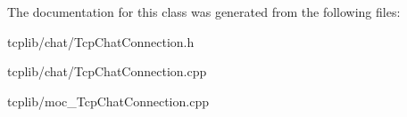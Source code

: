 

The documentation for this class was generated from the following files\-:\begin{DoxyCompactItemize}
\item 
tcplib/chat/Tcp\-Chat\-Connection.\-h\item 
tcplib/chat/Tcp\-Chat\-Connection.\-cpp\item 
tcplib/moc\-\_\-\-Tcp\-Chat\-Connection.\-cpp\end{DoxyCompactItemize}
